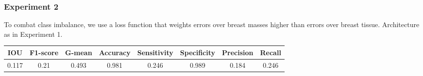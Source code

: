 \documentclass{beamer}
\begin{document}
	\begin{frame}
		\frametitle{Experiment 2}
		To combat class imbalance, we use a loss function that weights errors over breast masses higher than errors over breast tissue. Architecture as in Experiment 1.
		
		\scriptsize
		\begin{table}[h]
			\centering
			\begin{tabular}{cccccccc}
			\hline
			\textbf{IOU}	& \textbf{F1-score}	& \textbf{G-mean} &\textbf{Accuracy}	& \textbf{Sensitivity} & \textbf{Specificity} & \textbf{Precision} & \textbf{Recall}\\
			\hline
			 0.117 & 0.21 & 0.493 & 0.981 & 0.246 & 0.989 & 0.184 & 0.246\\
			\hline
			\end{tabular}
		\end{table}
	\end{frame}
	
\end{document}
